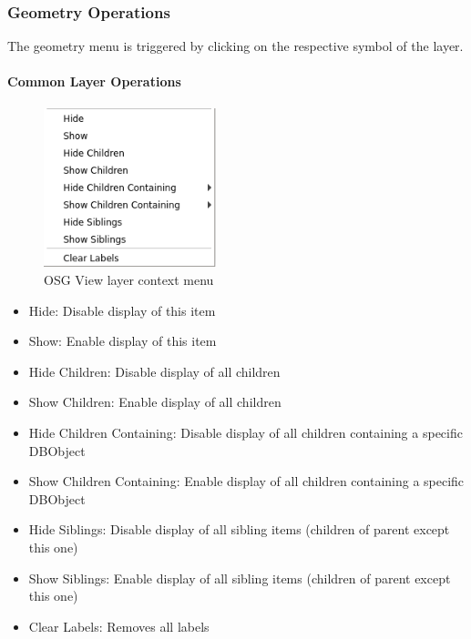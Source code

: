 \subsubsection{Geometry Operations}
\label{sec:geometry_operations}

The geometry menu is triggered by clicking on the respective symbol of the layer.\\

\paragraph{Common Layer Operations}
\begin{figure}[H]
    \includegraphics[width=5cm,frame]{../screenshots/osgview_layer_context_menu.png}
  \caption{OSG View layer context menu}
\end{figure}

\begin{itemize}
 \item Hide: Disable display of this item
 \item Show: Enable display of this item
 \item Hide Children: Disable display of all children
 \item Show Children: Enable display of all children
 \item Hide Children Containing: Disable display of all children containing a specific DBObject
 \item Show Children Containing: Enable display of all children containing a specific DBObject
 \item Hide Siblings: Disable display of all sibling items (children of parent except this one)
 \item Show Siblings: Enable display of all sibling items (children of parent except this one)
 \item Clear Labels: Removes all labels
\end{itemize}

